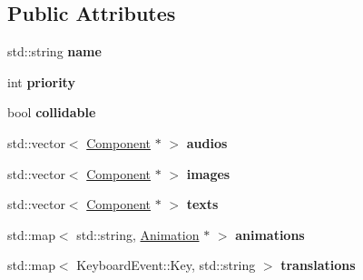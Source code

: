 \subsection*{Public Attributes}
\begin{DoxyCompactItemize}
\item 
std\+::string {\bfseries name}\hypertarget{classengine_1_1_game_object_a1f104f7af4f351e6d3278319762c9fe5}{}\label{classengine_1_1_game_object_a1f104f7af4f351e6d3278319762c9fe5}

\item 
int {\bfseries priority}\hypertarget{classengine_1_1_game_object_a159ecaca30229e302793b11a75bd13c2}{}\label{classengine_1_1_game_object_a159ecaca30229e302793b11a75bd13c2}

\item 
bool {\bfseries collidable}\hypertarget{classengine_1_1_game_object_a1044128797889af9aee10599b09174ed}{}\label{classengine_1_1_game_object_a1044128797889af9aee10599b09174ed}

\item 
std\+::vector$<$ \hyperlink{classengine_1_1_component}{Component} $\ast$ $>$ {\bfseries audios}\hypertarget{classengine_1_1_game_object_a1466e1d3fa4d30de06df15791d15cbc7}{}\label{classengine_1_1_game_object_a1466e1d3fa4d30de06df15791d15cbc7}

\item 
std\+::vector$<$ \hyperlink{classengine_1_1_component}{Component} $\ast$ $>$ {\bfseries images}\hypertarget{classengine_1_1_game_object_af79b2f893d53454481d085825e4898c8}{}\label{classengine_1_1_game_object_af79b2f893d53454481d085825e4898c8}

\item 
std\+::vector$<$ \hyperlink{classengine_1_1_component}{Component} $\ast$ $>$ {\bfseries texts}\hypertarget{classengine_1_1_game_object_aaff0b5ab01495a8f4cb806eb39300534}{}\label{classengine_1_1_game_object_aaff0b5ab01495a8f4cb806eb39300534}

\item 
std\+::map$<$ std\+::string, \hyperlink{classengine_1_1_animation}{Animation} $\ast$ $>$ {\bfseries animations}\hypertarget{classengine_1_1_game_object_a5cb70de44e18b89e4d298de907f1668a}{}\label{classengine_1_1_game_object_a5cb70de44e18b89e4d298de907f1668a}

\item 
std\+::map$<$ Keyboard\+Event\+::\+Key, std\+::string $>$ {\bfseries translations}\hypertarget{classengine_1_1_game_object_a6ac31651c772a941b08c4ce6f89c3bbc}{}\label{classengine_1_1_game_object_a6ac31651c772a941b08c4ce6f89c3bbc}


\end{DoxyCompactItemize}
